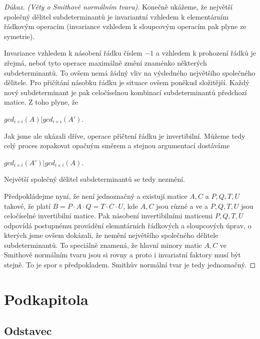 \begin{proof}[Důkaz. (Věty o Smithově normálním tvaru)]
Konečně ukážeme, že největší společný dělitel subdeterminantů je invariantní
vzhledem k elementárním řádkovým operacím (invariance vzhledem k sloupcovým
operacím pak plyne ze symetrie).

Invariance vzhledem k násobení řádku číslem $ -1 $ a vzhledem k prohození řádků
je zřejmá, neboť tyto operace maximálně změní znaménko některých subdeterminantů.
To ovšem nemá žádný vliv na výsledného největšího společného dělitele. Pro přičítání
násobku řádku je situace ovšem poněkud složitější. Každý nový subdeterminant je
pak celočíselnou kombinací subdeterminantů předchozí matice. Z toho plyne, že
\begin{center}
$ gcd_{i \times i }(A) \vert gcd_{i \times i }(A') $.
\end{center}

Jak jsme ale ukázali dříve, operace přičtení řádku je invertibilní. Můžeme tedy
celý proces zopakovat opačným směrem a stejnou argumentací dostáváme
\begin{center}
$ gcd_{i \times i }(A') \vert gcd_{i \times i }(A) $.
\end{center}
Největší společný dělitel subdeterminantů se tedy nezmění.

Předpokládejme nyní, že \snf není jednoznačný a existují matice $ A,C $ a $ P,Q,T,U$
takové, že platí $ B = P \cdot A \cdot Q = T \cdot C \cdot U $, kde $ A,C $ jsou
různé a ve \snf a $ P,Q,T,U$ jsou celočíselné invertibilní matice. Pak násobení
invertibilními maticemi $ P,Q,T,U$ odpovídá postupnému provádění elemntárních
řádkových a sloupcových úprav, o kterých jsme ovšem dokázali, že nemění největšího
společného dělitele subdeterminantů. To speciálně znamená, že hlavní minory matic
$ A,C $ ve Smithově normálním tvaru jsou si rovny a proto i invariatní faktory
musí být stejně. To je spor s předpokladem. Smithův normální tvar je tedy jednoznačný.

\end{proof}
\section{Podkapitola}

\lipsum[98-105]

\subsection{Odstavec}

\lipsum[140-145]
\shorthandon{-}
